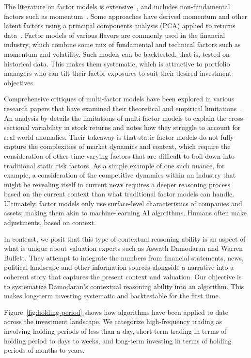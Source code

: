 \documentclass[]{interact}
\theoremstyle{plain}%
\theoremstyle{definition}
\theoremstyle{remark}
\begin{document}
The literature on factor models is extensive~\citep{giglio2022factor}, and includes non-fundamental factors such as momentum~\citep{jegadeesh1993returns,carhart1997persistence}. Some approaches have derived momentum and other latent factors using a principal components analysis (PCA) applied to returns data~\citep{chamberlain1982arbitrage}. Factor models of various flavors are commonly used in the financial industry, which combine some mix of fundamental and technical factors such as momentum and volatility. Such models can be backtested, that is, tested on historical data. This makes them systematic, which is attractive to portfolio managers who can tilt their factor exposures to suit their desired investment objectives.

Comprehensive critiques of multi-factor models have been explored in various research papers that have examined their theoretical and empirical limitations~\citep{harvey2016and}. An analysis by \citet{kelly2019characteristics} details the limitations of multi-factor models to explain the cross-sectional variability in stock returns and notes how they struggle to account for real-world anomalies. Their takeaway is that static factor models do not fully capture the complexities of market dynamics and context, which require the consideration of other time-varying factors that are difficult to boil down into traditional static risk factors. As a simple example of one such nuance, for example, a consideration of the competitive dynamics within an industry that might be revealing itself in current news requires a deeper reasoning process based on the current context than what traditional factor models can handle. Ultimately, factor models only use surface-level characteristics of companies and assets; making them akin to machine-learning AI algorithms. Humans often make adjustments, based on context.

In contrast, we posit that this type of contextual reasoning ability is an aspect of what is unique about valuation experts such as Aswath Damodaran and Warren Buffett. They attempt to integrate the numbers from financial statements, news, political landscape and other information sources alongside a narrative into a coherent story that captures the present context and valuation. 
Our objective is to systematize Damodaran’s contextual reasoning ability into an algorithm. This makes long-term investing systematic and backtestable for the first time.

Figure~\ref{fig:holding-period} shows how algorithms have been applied to date across the investment landscape. We categorize high-frequency trading as involving holding periods of less than a day, short-term trading in terms of holding period to days to weeks, and long-term investing in terms of holding periods of months to years. 
\end{document}
